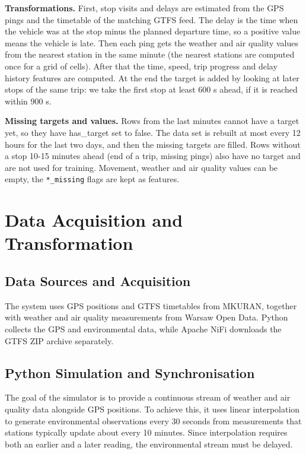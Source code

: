 \documentclass[11pt]{article}
\begin{document}
\noindent\textbf{Transformations.}
First, stop visits and delays are estimated from the GPS pings and the timetable of the matching GTFS feed. The delay is the time
when the vehicle was at the stop minus the planned departure time, so a positive value means the vehicle is late.
Then each ping gets the weather and air quality values from the nearest station in the same minute (the nearest stations are
computed once for a grid of cells). After that the time, speed, trip progress and delay history features are computed.
At the end the target is added by looking at later stops of the same trip: we take the first stop at least 600 s ahead,
if it is reached within 900 s.

\noindent\textbf{Missing targets and values.}
Rows from the last minutes cannot have a target yet, so they have has\_target set to false. The data set is rebuilt at most every
12 hours for the last two days, and then the missing targets are filled. Rows without a stop 10-15 minutes ahead (end of a trip,
missing pings) also have no target and are not used for training. Movement, weather and air quality values can be empty, the
\texttt{*\_missing} flags are kept as features.

\section{Data Acquisition and Transformation}
\label{sec:data-acquisition-transformation}

\subsection{Data Sources and Acquisition}

The system uses GPS positions and GTFS timetables from MKURAN, together with weather and air quality measurements from Warsaw Open Data. Python collects the GPS and environmental data, while Apache NiFi downloads the GTFS ZIP archive separately.

\subsection{Python Simulation and Synchronisation}

The goal of the simulator is to provide a continuous stream of weather and air quality data alongside GPS positions. To achieve this, it uses linear interpolation to generate environmental observations every 30 seconds from measurements that stations typically update about every 10 minutes. Since interpolation requires both an earlier and a later reading, the environmental stream must be delayed.
\end{document}
